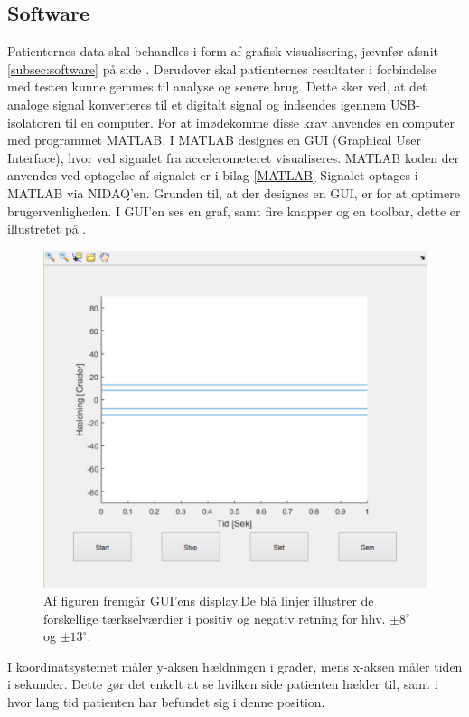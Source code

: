 \subsection{Software}
Patienternes data skal behandles i form af grafisk visualisering, jævnfør afsnit \ref{subsec:software} på side \pageref{subsec:software}. Derudover skal patienternes resultater i forbindelse med testen kunne gemmes til analyse og senere brug. Dette sker ved, at det analoge signal konverteres til et digitalt signal og indsendes igennem USB-isolatoren til en computer. For at imødekomme disse krav anvendes en computer med programmet MATLAB. I MATLAB designes en GUI (Graphical User Interface), hvor ved signalet fra accelerometeret visualiseres. MATLAB koden der anvendes ved optagelse af signalet er i bilag \ref{MATLAB} Signalet optages i MATLAB via NIDAQ'en. Grunden til, at der designes en GUI, er for at optimere brugervenligheden. I GUI'en ses en graf, samt fire knapper og en toolbar, dette er illustretet på . 
\begin{figure}[H] 
	\centering 
	\includegraphics[scale=0.5]{figures/cProblemloesning/GUI_generisk.PNG}
	\caption{Af figuren fremgår GUI'ens display.De blå linjer illustrer de forskellige tærkselværdier i positiv og negativ retning for hhv. $\pm 8^{\circ}$ og $\pm 13^{\circ}$.}
	\label{Fig:GUI_generisk}
\end{figure} 
I koordinatsystemet måler y-aksen hældningen i grader, mens x-aksen måler tiden i sekunder. Dette gør det enkelt at se hvilken side patienten hælder til, samt i hvor lang tid patienten har befundet sig i denne position.
